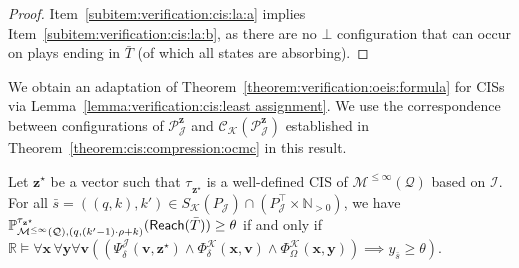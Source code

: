 \documentclass[a4paper,UKenglish,cleveref,autoref,thm-restate,colorlinks]{lipics-v2021}
\newcommand{\IR}{\mathbb{R}}
\newcommand{\IN}{\mathbb{N}}
\newcommand{\INpos}{\IN_{>0}}
\newcommand{\mdp}{\mathcal{M}}
\newcommand{\mdpStateSpace}{S}
\newcommand{\ocmdp}{\mathcal{Q}}
\newcommand{\ocmdpFin}[2]{\mdp^{\leq #2}(#1)}
\newcommand{\ocState}{q}
\newcommand{\ocCount}{k}
\newcommand{\ocCountB}{k'}
\newcommand{\ocConfig}{s}
\newcommand{\ocTrans}{\delta}
\newcommand{\period}{\rho}
\newcommand{\mchain}{\mathcal{C}}
\newcommand{\ocChain}{\mathcal{P}}
\newcommand{\intPart}{\mathcal{I}}
\newcommand{\intPartB}{\mathcal{J}}
\newcommand{\intPartC}{\mathcal{K}}
\newcommand{\cisChainStrat}[1]{\ocChain^{#1}_{\intPartB}}
\newcommand{\cisChainStateSpace}{P_{\intPartB}}
\newcommand{\cisChainStateSpaceStar}{P_{\intPartB}^{\top}}
\newcommand{\compressCisStateSpace}{\mdpStateSpace_{\intPartC}({\cisChainStateSpace})}
\newcommand{\cisConfig}{\bar{\ocConfig}}
\newcommand{\varTrans}{x}
\newcommand{\varTransTuple}{\mathbf{\varTrans}}
\newcommand{\varObj}{y}
\newcommand{\varObjTuple}{\mathbf{\varObj}}
\newcommand{\varStrat}{z}
\newcommand{\varStratTuple}{\mathbf{\varStrat}}
\newcommand{\solStratTuple}{\mathbf{\varStrat}^{\star}}
\newcommand{\varCis}{v}
\newcommand{\varCisTuple}{\mathbf{\varCis}}
\newcommand{\cisChainSymbolic}{\cisChainStrat{\varStratTuple}}
\newcommand{\compressCisSymbolic}{\mchain_{\intPartC}({\cisChainSymbolic})}
\newcommand{\formulaTransBase}{\Phi_{\ocTrans}}
\newcommand{\formulaObjBase}{\Phi_{\objective}}
\newcommand{\formulaCisBase}{\Psi_{\ocTrans}}
\newcommand{\formulaCis}{\formulaCisBase^\intPartB}
\newcommand{\formulaCisTrans}{\formulaTransBase^\intPartC}
\newcommand{\formulaCisObj}{\formulaObjBase^\intPartC}
\newcommand{\objective}{\Omega}
\newcommand{\reach}[1]{\mathsf{Reach}(#1)}
\newcommand{\target}{T}
\newcommand{\thresProba}{\theta}
\newcommand{\stratBGeneric}[1]{{\tau_{#1}}}
\newcommand{\stratB}{\stratBGeneric{}}
\begin{document}
\begin{proof}
  Item~\ref{subitem:verification:cis:la:a} implies Item~\ref{subitem:verification:cis:la:b}, as there are no $\bot$ configuration that can occur on plays ending in $\bar{\target}$ (of which all states are absorbing).
\end{proof}

We obtain an adaptation of Theorem~\ref{theorem:verification:oeis:formula} for CISs via Lemma~\ref{lemma:verification:cis:least assignment}.
We use the correspondence between configurations of $\cisChainSymbolic$ and $\compressCisSymbolic$ established in Theorem~\ref{theorem:cis:compression:ocmc} in this result.

\begin{theorem}\label{theorem:verification:cis:formula}
  Let $\solStratTuple$ be a vector such that $\stratB_{\solStratTuple}$ is a well-defined CIS of $\ocmdpFin{\ocmdp}{\infty}$ based on $\intPart$.
  For all $\cisConfig = ((\ocState, \ocCount), \ocCountB)\in\compressCisStateSpace\cap(\cisChainStateSpaceStar\times\INpos)$, we have $\probaGverb{\ocmdpFin{\ocmdp}{\infty}}{(\ocState, (\ocCountB-1)\cdot\period+\ocCount)}{\stratB_{\solStratTuple}}(\reach{\bar{\target}})\geq\thresProba$ if and only if $\IR\models\forall\varTransTuple\,\forall\varObjTuple\forall\varCisTuple ((\formulaCis(\varCisTuple, \solStratTuple)\land\formulaCisTrans(\varTransTuple,\varCisTuple)\land\formulaCisObj(\varTransTuple, \varObjTuple))\implies \varObj_{\cisConfig}\geq\thresProba)$.
\end{theorem}
\end{document}
